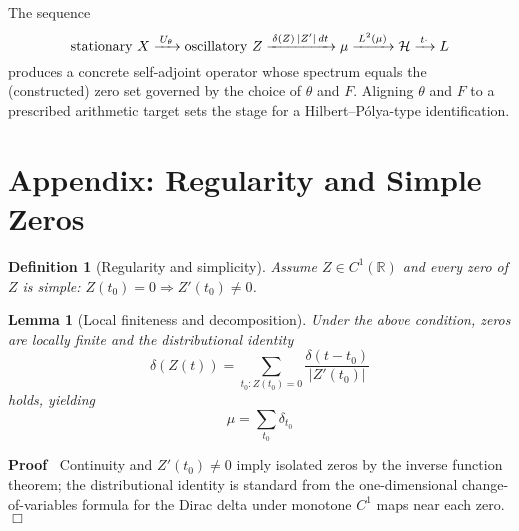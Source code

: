 \documentclass{article}
\newenvironment{proof}{\noindent\textbf{Proof\ }}{\hspace*{\fill}$\Box$\medskip}
\newtheorem{definition}{Definition}
\newtheorem{lemma}{Lemma}
\begin{document}
\begin{remark}
   The sequence
  \begin{equation}
    \text{stationary } X \xrightarrow{\hspace{0.17em} U_{\theta}
    \hspace{0.17em}} \text{oscillatory } Z \xrightarrow{\hspace{0.17em} \delta
    (Z) \hspace{0.17em} |Z' |  \hspace{0.17em} dt \hspace{0.17em}} \mu
    \xrightarrow{\hspace{0.17em} L^2 (\mu) \hspace{0.17em}} \mathcal{H}
    \xrightarrow{\hspace{0.17em} t \cdot \hspace{0.17em}} L
  \end{equation}
  produces a concrete self-adjoint operator whose spectrum equals the
  (constructed) zero set governed by the choice of $\theta$ and $F$. Aligning
  $\theta$ and $F$ to a prescribed arithmetic target sets the stage for a
  Hilbert--P{\'o}lya-type identification.
\end{remark}

\section{Appendix: Regularity and Simple Zeros}

\begin{definition}
  [Regularity and simplicity] Assume $Z \in C^1 (\mathbb{R})$ and every zero
  of $Z$ is simple: $Z (t_0) = 0 \Longrightarrow Z' (t_0) \neq 0$.
\end{definition}

\begin{lemma}
  [Local finiteness and decomposition] Under the above condition, zeros are
  locally finite and the distributional identity
  \begin{equation}
    \delta (Z (t)) = \sum_{t_0 : Z (t_0) = 0} \frac{\delta (t - t_0)}{|Z'
    (t_0) |}
  \end{equation}
  holds, yielding
  \begin{equation}
    \mu = \sum_{t_0} \delta_{t_0}
  \end{equation}
\end{lemma}

\begin{proof}
  Continuity and $Z' (t_0) \neq 0$ imply isolated zeros by the inverse
  function theorem; the distributional identity is standard from the
  one-dimensional change-of-variables formula for the Dirac delta under
  monotone $C^1$ maps near each zero.
\end{proof}
\end{document}
